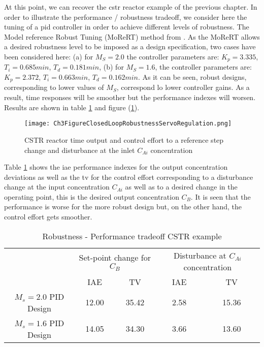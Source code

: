 At this point, we can recover the \gls{cstr} reactor example of the previous chapter. In order to illustrate the performance / robustness tradeoff, we consider here the tuning of a \gls{pid} controller in order to achieve different levels of robustness. The Model reference Robust Tuning (MoReRT) method from \cite{Alfaro2016}. As the MoReRT allows a desired robustness level to be imposed as a design specification, two cases have been considered here: (a) for $M_S=2.0$ the controller parameters are: $K_p=3.335$, $T_i =0.685 min$, $T_d=0.181 min$, (b) for $M_S=1.6$, the controller parameters are: $K_p=2.372$, $T_i=0.663 min$, $T_d=0.162 min$. As it can be seen, robust designs, corresponding to lower values of $M_S$, correspond lo lower controller gains. As a result, time responses will be smoother but the performance indexes will worsen. Results are shown in table \ref{tab:cstrtradeoff} and figure (\ref{ch3:fig:Ch3FigureClosedLoopRobustnessServoRegulation}). 
%
\begin{figure}[tb]
    \begin{center}
        \texttt{[image: Ch3FigureClosedLoopRobustnessServoRegulation.png]}
        \caption{CSTR reactor time output and control effort to a reference step change and disturbance at the inlet $C_{Ai}$ concentration }
        \label{ch3:fig:Ch3FigureClosedLoopRobustnessServoRegulation}
    \end{center}
\end{figure}

Table \ref{tab:cstrtradeoff} shows the \gls{iae} performance indexes for the output concentration deviations as well as the \gls{tv} for the control effort corresponding to a disturbance change at the input concentration $C_{Ai}$ as well as to a desired change in the operating point, this is the desired output concentration $C_B$. It is seen that the performance is worse for the more robust design but, on the other hand, the control effort gets smoother. 
\begin{table}[tb]
	\caption{Robustness - Performance tradeoff CSTR example} \label{tab:cstrtradeoff}
	\centering
    \begin{tabular}{ccccc}
    \toprule
    	 & \multicolumn{2}{c}{Set-point change for $C_B$}  & \multicolumn{2}{c}{Disturbance at $C_{Ai}$ concentration}\\
   		 & IAE & TV & IAE & TV\\
    \midrule
    $M_s=2.0$ PID Design   & 12.00 & 35.42 & 2.58 & 15.36 \\
    $M_s=1.6$ PID Design   & 14.05 & 34.30 & 3.66 & 13.60 \\
    \bottomrule
    \end{tabular}
\end{table}
%
